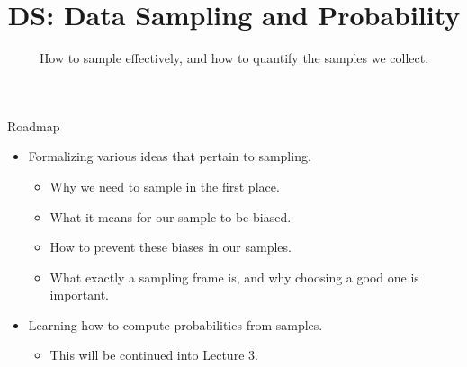 \documentclass[aspectratio=169]{../latex_main/tntbeamer}  %
\title[Introduction]{DS: Data Sampling and Probability}
\subtitle{How to sample effectively, and how to quantify the samples we collect.}
\begin{document}
	
	\maketitle
	
	\begin{frame}{Roadmap}
	    \begin{itemize}
	        \item Formalizing various ideas that pertain to sampling.
	        \begin{itemize}
	            \item Why we need to sample in the first place.
	            \item What it means for our sample to be biased.
	            \item How to prevent these biases in our samples.
	            \item What exactly a sampling frame is, and why choosing a good one is important.
	        \end{itemize}
	        \item Learning how to compute probabilities from samples.
	        \begin{itemize}
	            \item This will be continued into Lecture 3.
	        \end{itemize}
	    \end{itemize}
	\end{frame}
	
\end{document}
